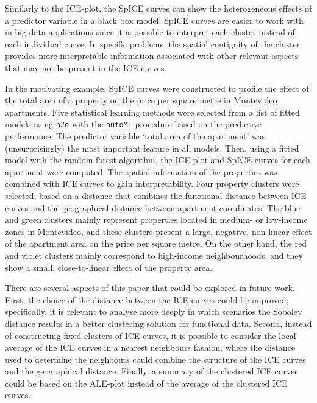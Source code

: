\documentclass[smallextended,natbib]{svjour3}\usepackage[]{graphicx}\usepackage[]{xcolor}
\newcommand{\1}[1]{\mathbbm{1}_{#1}}
\begin{document}
Similarly to the ICE-plot, the SpICE curves can show the heterogeneous effects of a predictor variable in a black box model. SpICE curves are easier to work with in big data applications since it is possible to interpret each cluster instead of each individual curve. In specific problems, the spatial contiguity of the cluster provides more interpretable information associated with other relevant aspects that may not be present in the ICE curves. 

In the motivating example, SpICE curves were constructed to profile the effect of the total area of a property on the  price per square metre in Montevideo apartments. Five statistical learning methods were selected from a list of fitted models using \texttt{h2o} with the \texttt{autoML} procedure based on the predictive performance. The predictor variable `total area of the apartment' was (unsurprisingly) the most important feature in  all models. Then, using a fitted model with the random forest algorithm, the ICE-plot and SpICE curves for each apartment were computed. The spatial information of the properties was combined with ICE curves to gain interpretability. Four property clusters were selected, based on a distance that combines the functional distance between ICE curves and the geographical distance between apartment coordinates.  The blue and green clusters mainly represent properties located in medium- or low-income zones in Montevideo, and these clusters present a large, negative, non-linear effect of the apartment area on the price per square metre. On the other hand, the red and violet clusters mainly correspond to high-income neighbourhoods, and they show a small, close-to-linear effect of the property area. 

There are several aspects of this paper that could be explored in future work. First, the choice of the distance between the ICE curves could be improved; specifically, it is relevant to analyse more deeply in which scenarios the Sobolev distance results in a better clustering solution for functional data.  Second, instead of constructing fixed clusters of ICE curves, it is possible to consider the local average of the ICE curves in a nearest neighbours fashion, where the distance used to determine the neighbours could combine the structure of the ICE curves and the geographical distance. Finally, a summary of the clustered ICE curves could be based on the ALE-plot instead of the average of the clustered ICE curves. 
\end{document}
